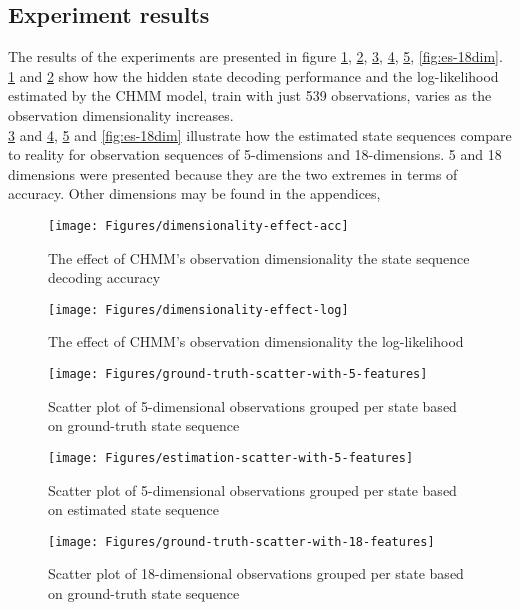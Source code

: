 \subsection{Experiment results}
The results of the experiments are presented in figure \ref{fig:dim-acc}, \ref{fig:dim-log}, \ref{fig:gt-5dim}, \ref{fig:es-5dim}, \ref{fig:gt-18dim}, \ref{fig:es-18dim}.\\
\ref{fig:dim-acc} and \ref{fig:dim-log} show how the hidden state decoding performance and the log-likelihood estimated by the CHMM model, train with just 539 observations, varies as the observation dimensionality increases.\\
\ref{fig:gt-5dim} and \ref{fig:es-5dim}, \ref{fig:gt-18dim} and \ref{fig:es-18dim} illustrate how the estimated state sequences compare to reality for observation sequences of 5-dimensions and 18-dimensions.    
5 and 18 dimensions were presented because they are the two extremes in terms of accuracy. Other dimensions may be found in the appendices, %
\begin{figure}[ht!]
	\texttt{[image: Figures/dimensionality-effect-acc]}
	\caption{The effect of CHMM's observation dimensionality the state sequence decoding accuracy}
	\label{fig:dim-acc}
\end{figure}

\begin{figure}[ht!]
	\texttt{[image: Figures/dimensionality-effect-log]}
	\caption{The effect of CHMM's observation dimensionality the log-likelihood}
	\label{fig:dim-log}
\end{figure}


\begin{figure}[ht!]
	\texttt{[image: Figures/ground-truth-scatter-with-5-features]}
	\caption{Scatter plot of  5-dimensional observations grouped per state based on ground-truth state sequence}
	\label{fig:gt-5dim}
\end{figure}
\begin{figure}[ht!]
	\texttt{[image: Figures/estimation-scatter-with-5-features]}
	\caption{Scatter plot of 5-dimensional observations grouped per state based on estimated state sequence}
	\label{fig:es-5dim}
\end{figure}

\begin{figure}[ht!]
	\texttt{[image: Figures/ground-truth-scatter-with-18-features]}
	\caption{Scatter plot of 18-dimensional observations grouped per state based on ground-truth state sequence}
	\label{fig:gt-18dim}
\end{figure}

